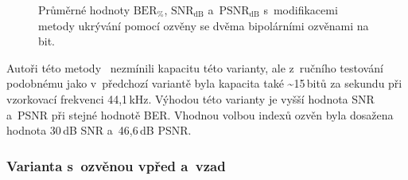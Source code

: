 \begin{figure}[H]
    \table
    \centering
    \caption{Průměrné hodnoty $\mathrm{BER}_{\%}$, $\mathrm{SNR}_\mathrm{dB}$
    a~$\mathrm{PSNR}_\mathrm{dB}$ s~modifikacemi metody ukrývání pomocí
    ozvěny se dvěma bipolárními ozvěnami na bit.}
    \label{pic:modifications-mean-values-echo-bipolar}
\end{figure}

Autoři této metody~\cite{Oh2001} nezmínili kapacitu této varianty, ale
z~ručního testování podobnému jako v~předchozí variantě byla kapacita také
\textasciitilde15\,bitů za sekundu při vzorkovací frekvenci 44,1\,kHz. Výhodou
této varianty je vyšší hodnota SNR a~PSNR při stejné hodnotě BER. Vhodnou
volbou indexů ozvěn byla dosažena hodnota 30\,dB SNR a~46,6\,dB PSNR.

\subsubsection*{Varianta s~ozvěnou vpřed a~vzad}

